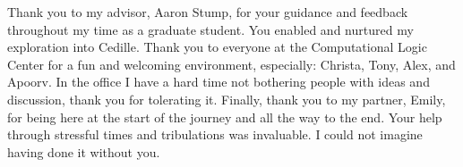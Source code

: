 \begin{acknowledgments}

Thank you to my advisor, Aaron Stump, for your guidance and feedback throughout my time as a graduate student.
You enabled and nurtured my exploration into Cedille.
Thank you to everyone at the Computational Logic Center for a fun and welcoming environment, especially: Christa, Tony, Alex, and Apoorv.
In the office I have a hard time not bothering people with ideas and discussion, thank you for tolerating it.
Finally, thank you to my partner, Emily, for being here at the start of the journey and all the way to the end.
Your help through stressful times and tribulations was invaluable.
I could not imagine having done it without you.

\end{acknowledgments}
